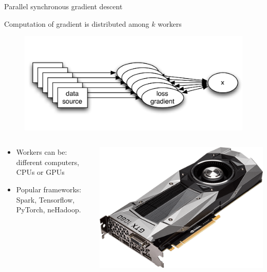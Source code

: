 \documentclass[10pt]{beamer}
\begin{document}
\begin{frame}{Parallel synchronous gradient descent}

Computation of gradient is distributed among $k$ workers

\begin{figure}
{\centering\includegraphics[width=0.5\linewidth]{img/mapreduce}}
\end{figure}

\begin{columns}
\begin{column}{0.7\textwidth}  %
\begin{itemize}
\item Workers can be: different computers, CPUs or GPUs

\item Popular frameworks: Spark, Tensorflow, PyTorch, neHadoop.
\end{itemize}
\end{column}
\begin{column}{0.3\textwidth}  %
\includegraphics[width=\linewidth]{img/gpu}
\end{column}
\end{columns}
\end{frame}
\end{document}
